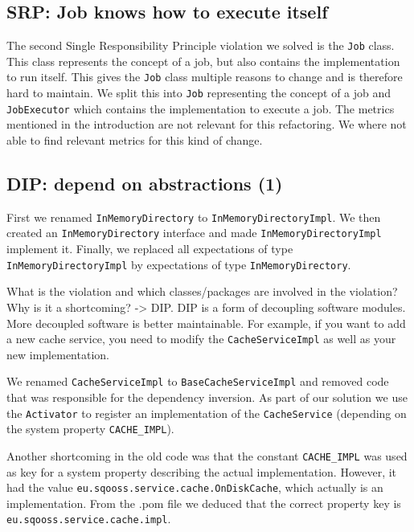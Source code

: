 \documentclass{article}
\begin{document}
\subsection{SRP: Job knows how to execute itself}
The second Single Responsibility Principle violation we solved is the \verb|Job| class. This class represents the concept of a job, but also contains the implementation to run itself. This gives the \verb|Job| class multiple reasons to change and is therefore hard to maintain.
We split this into \verb|Job| representing the concept of a job and \verb|JobExecutor| which contains the implementation to execute a job. The metrics mentioned in the introduction are not relevant for this refactoring. We where not able to find relevant metrics for this kind of change.


\subsection{DIP: depend on abstractions (1)}
First we renamed \verb|InMemoryDirectory| to \verb|InMemoryDirectoryImpl|. We then created an \texttt{InMemoryDirectory} interface and made \verb|InMemoryDirectoryImpl| implement it. Finally, we replaced all expectations of type \verb|InMemoryDirectoryImpl| by expectations of type \verb|InMemoryDirectory|.

What is the violation and which classes/packages are involved in the violation? Why is it a shortcoming?
 -> DIP. DIP is a form of decoupling software modules. More decoupled software is better maintainable. For example, if you want to add a new cache service, you need to modify the \verb|CacheServiceImpl| as well as your new implementation.

We renamed \verb|CacheServiceImpl| to \verb|BaseCacheServiceImpl| and removed code that was responsible for the dependency inversion. As part of our solution we use the \verb|Activator| to register an implementation of the \verb|CacheService| (depending on the system property \verb|CACHE_IMPL|).

Another shortcoming in the old code was that the constant \verb|CACHE_IMPL| was used as key for a system property describing the actual implementation. However, it had the value \texttt{eu\allowbreak.sqooss.service.cache.OnDiskCache}, which actually is an implementation. From the .pom file we deduced that the correct property key is \verb|eu.sqooss.service.cache.impl|.
\end{document}
